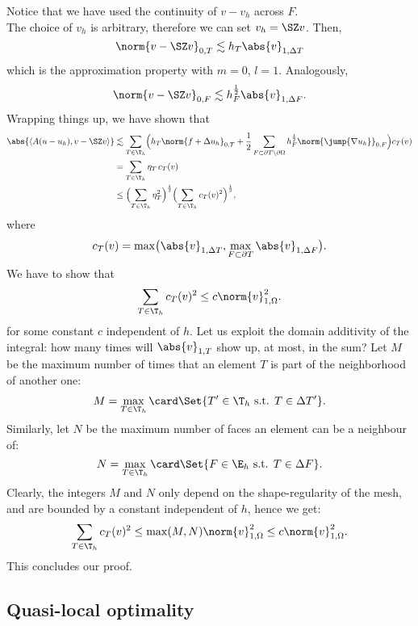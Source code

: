 Notice that we have used the continuity of $v-v_h$ across $F$.\\
 The choice of $v_h$ is arbitrary, therefore we can set $v_h = \SZ v$. Then,
\[
\norm{v-\SZ v}_{0,T} \lesssim h_T \abs{v}_{1,\Delta T}
\]
which is the approximation property with $m=0$, $l=1$. Analogously,
\[
\norm{v-\SZ v}_{0,F} \lesssim h_F^{\frac{1}{2}} \abs{v}_{1,\Delta F}.
\]
Wrapping things up, we have shown that
\begin{align}
\abs{\langle A(u-u_h),v-\SZ v \rangle} &\lesssim
\sum_{T \in \T_h} \Bigl( h_T \norm{f + \Delta u_h}_{0,T} +
    \frac{1}{2} \sum_{F \subset \partial T\setminus\partial\Omega} h_F^\frac{1}{2} \norm{\jump{\nabla u_h}}_{0,F} \Bigr) c_T(v) \\
    &= \sum_{T \in \T_h} \eta_T \, c_T(v) \\
    &\le \Bigl( \sum_{T \in \T_h} \eta_T^2 \Bigr)^\frac{1}{2}
    \Bigl( \sum_{T \in \T_h} c_T(v)^2 \Bigr)^\frac{1}{2},
\end{align}
where
\[
c_T(v) = \max \bigl( \abs{v}_{1,\Delta T}, \max_{F \subset \partial T} \abs{v}_{1,\Delta F} \bigr).
\]
 We have to show that
\[
\sum_{T \in \T_h} c_T(v)^2 \le c \norm{v}_{1,\Omega}^2.
\]
for some constant $c$ independent of $h$. Let us exploit the domain additivity of the integral: how many times will $\abs{v}_{1,T}$ show up, at most, in the sum? Let $M$ be the maximum number of times that an element $T$ is part of the neighborhood of another one:
\[
M = \max_{T \in \T_h} \card \Set{T'\in\T_h \text{ s.t. } T \in \Delta T'}.
\]
Similarly, let $N$ be the maximum number of faces an element can be a neighbour of:
\[
N = \max_{T \in \T_h} \card \Set{F\in\E_h \text{ s.t. } T \in \Delta F}.
\]
Clearly, the integers $M$ and $N$ only depend on the shape-regularity of the mesh, and are bounded by a constant independent of $h$, hence we get:
\[
\sum_{T \in \T_h} c_T(v)^2 \le \max(M,N) \norm{v}_{1,\Omega}^2
\le c \norm{v}_{1,\Omega}^2.
\]
This concludes our proof.


\subsection{Quasi-local optimality}

